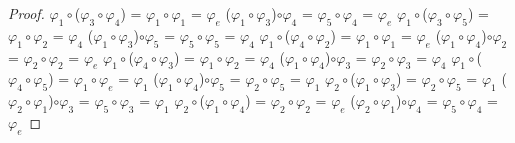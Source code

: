 \documentclass[10pt,a4paper,oneside]{article}
\begin{document}
\begin{proof}
				\newline
				\newline
				$\varphi_{1}\circ$($\varphi_{3}\circ\varphi_{4}$) = $\varphi_{1}\circ\varphi_{1}$ = $\varphi_{e}$
				\newline
				($\varphi_{1}\circ\varphi_{3}$)$\circ\varphi_{4}$ = $\varphi_{5}\circ\varphi_{4}$ = $\varphi_{e}$
				\newline
				\newline
				$\varphi_{1}\circ$($\varphi_{3}\circ\varphi_{5}$) = $\varphi_{1}\circ\varphi_{2}$ = $\varphi_{4}$
				\newline
				($\varphi_{1}\circ\varphi_{3}$)$\circ\varphi_{5}$ = $\varphi_{5}\circ\varphi_{5}$ = $\varphi_{4}$
				\newline
				\newline
				$\varphi_{1}\circ$($\varphi_{4}\circ\varphi_{2}$) = $\varphi_{1}\circ\varphi_{1}$ = $\varphi_{e}$
				\newline
				($\varphi_{1}\circ\varphi_{4}$)$\circ\varphi_{2}$ = $\varphi_{2}\circ\varphi_{2}$ = $\varphi_{e}$
				\newline
				\newline
				$\varphi_{1}\circ$($\varphi_{4}\circ\varphi_{3}$) = $\varphi_{1}\circ\varphi_{2}$ = $\varphi_{4}$
				\newline
				($\varphi_{1}\circ\varphi_{4}$)$\circ\varphi_{3}$ = $\varphi_{2}\circ\varphi_{3}$ = $\varphi_{4}$
				\newline
				\newline
				$\varphi_{1}\circ$($\varphi_{4}\circ\varphi_{5}$) = $\varphi_{1}\circ\varphi_{e}$ = $\varphi_{1}$
				\newline
				($\varphi_{1}\circ\varphi_{4}$)$\circ\varphi_{5}$ = $\varphi_{2}\circ\varphi_{5}$ = $\varphi_{1}$
				\newline
				\newline
				$\varphi_{2}\circ$($\varphi_{1}\circ\varphi_{3}$) = $\varphi_{2}\circ\varphi_{5}$ = $\varphi_{1}$
				\newline
				($\varphi_{2}\circ\varphi_{1}$)$\circ\varphi_{3}$ = $\varphi_{5}\circ\varphi_{3}$ = $\varphi_{1}$
				\newline
				\newline
				$\varphi_{2}\circ$($\varphi_{1}\circ\varphi_{4}$) = $\varphi_{2}\circ\varphi_{2}$ = $\varphi_{e}$
				\newline
				($\varphi_{2}\circ\varphi_{1}$)$\circ\varphi_{4}$ = $\varphi_{5}\circ\varphi_{4}$ = $\varphi_{e}$
				\newline

\end{proof}
\end{document}
